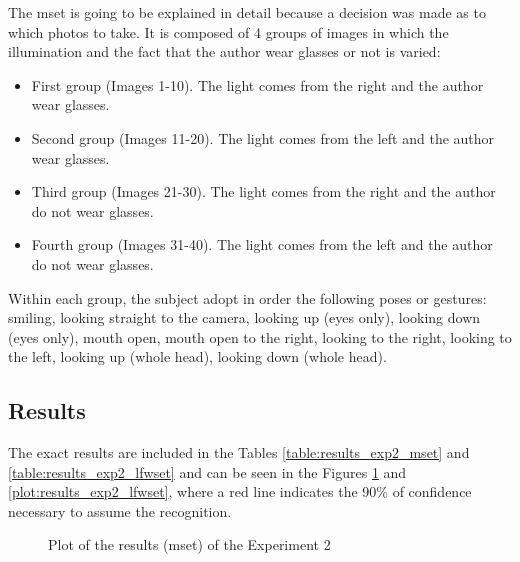 	The \gls{mset} is going to be explained in detail because a decision was made as to which photos to take. It is composed of 4 groups of images in which the illumination and the fact that the author wear glasses or not is varied:

	\begin{itemize}
		\item First group (Images 1-10). The light comes from the right and the author wear glasses.
		\item Second group (Images 11-20). The light comes from the left and the author wear glasses.
		\item Third group (Images 21-30). The light comes from the right and the author do not wear glasses.
		\item Fourth group (Images 31-40). The light comes from the left and the author do not wear glasses.
	\end{itemize}

	Within each group, the subject adopt in order the following poses or gestures: smiling, looking straight to the camera, looking up (eyes only), looking down (eyes only), mouth open, mouth open to the right, looking to the right, looking to the left, looking up (whole head), looking down (whole head).

	\subsection{Results}
	The exact results are included in the Tables \ref{table:results_exp2_mset} and \ref{table:results_exp2_lfwset} and can be seen in the Figures \ref{plot:results_exp2_mset} and \ref{plot:results_exp2_lfwset}, where a red line indicates the 90\% of confidence necessary to assume the recognition.

	\vspace{2cm}

	\begin{figure}[!ht]
		\centering
		\resizebox{\textwidth}{!}
		{		
		}
		\caption{Plot of the results (\gls{mset}) of the Experiment 2}
		\label{plot:results_exp2_mset}
	\end{figure}


